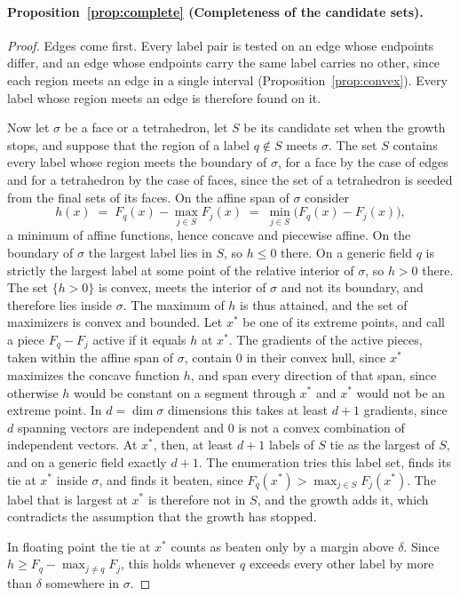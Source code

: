 \documentclass[11pt]{article}
\theoremstyle{definition}
\newcommand{\interp}{F}
\begin{document}
\paragraph*{Proposition~\ref{prop:complete} (Completeness of the candidate sets).}
\begin{proof}
Edges come first. Every label pair is tested on an edge whose endpoints
differ, and an edge whose endpoints carry the same label carries no other,
since each region meets an edge in a single interval
(Proposition~\ref{prop:convex}). Every label whose region meets an edge is
therefore found on it.

Now let $\sigma$ be a face or a tetrahedron, let $S$ be its candidate set when
the growth stops, and suppose that the region of a label $q \notin S$ meets
$\sigma$. The set $S$ contains every label whose region meets the boundary of
$\sigma$, for a face by the case of edges and for a tetrahedron by the case
of faces, since the set of a tetrahedron is seeded from the final sets of its
faces. On the affine span of $\sigma$ consider
\[
  h(x) \;=\; \interp_q(x) - \max_{j \in S} \interp_j(x)
       \;=\; \min_{j \in S} \big(\interp_q(x) - \interp_j(x)\big),
\]
a minimum of affine functions, hence concave and piecewise affine. On the
boundary of $\sigma$ the largest label lies in $S$, so $h \le 0$ there. On a
generic field $q$ is strictly the largest label at some point of the relative
interior of $\sigma$, so $h > 0$ there. The set $\{h > 0\}$ is convex, meets
the interior of $\sigma$ and not its boundary, and therefore lies inside
$\sigma$. The maximum of $h$ is thus attained, and the set of maximizers is
convex and bounded. Let $x^\ast$ be one of its extreme points, and call a
piece $\interp_q - \interp_j$ active if it equals $h$ at $x^\ast$. The
gradients of the active pieces, taken within the affine span of $\sigma$,
contain $0$ in their convex hull, since $x^\ast$ maximizes the concave
function $h$, and span every direction of that span, since otherwise $h$
would be constant on a segment through $x^\ast$ and $x^\ast$ would not be an
extreme point. In $d = \dim\sigma$ dimensions this takes at least $d+1$
gradients, since $d$ spanning vectors are independent and $0$ is not a convex
combination of independent vectors. At $x^\ast$, then, at least $d+1$ labels
of $S$ tie as the largest of $S$, and on a generic field exactly $d+1$. The
enumeration tries this label set, finds its tie at $x^\ast$ inside
$\sigma$, and finds it beaten, since
$\interp_q(x^\ast) > \max_{j\in S}\interp_j(x^\ast)$. The label that is
largest at $x^\ast$ is therefore not in $S$, and the growth adds it, which
contradicts the assumption that the growth has stopped.

In floating point the tie at $x^\ast$ counts as beaten only by a margin
above $\delta$. Since $h \ge \interp_q - \max_{j \ne q}\interp_j$, this holds
whenever $q$ exceeds every other label by more than $\delta$ somewhere in
$\sigma$.
\end{proof}
\end{document}
